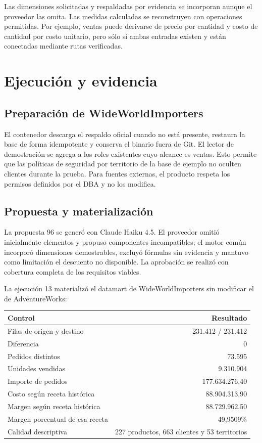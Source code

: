 \documentclass[11pt,letterpaper]{article}
\begin{document}
Las dimensiones solicitadas y respaldadas por evidencia se incorporan aunque el proveedor
las omita. Las medidas calculadas se reconstruyen con operaciones permitidas. Por ejemplo,
ventas puede derivarse de precio por cantidad y costo de cantidad por costo unitario, pero
sólo si ambas entradas existen y están conectadas mediante rutas verificadas.

\section{Ejecución y evidencia}

\subsection{Preparación de WideWorldImporters}

El contenedor descarga el respaldo oficial cuando no está presente, restaura la base de
forma idempotente y conserva el binario fuera de Git. El lector de demostración se agrega
a los roles existentes cuyo alcance es ventas. Esto permite que las políticas de seguridad
por territorio de la base de ejemplo no oculten clientes durante la prueba. Para fuentes
externas, el producto respeta los permisos definidos por el DBA y no los modifica.

\subsection{Propuesta y materialización}

La propuesta 96 se generó con Claude Haiku 4.5. El proveedor omitió inicialmente elementos
y propuso componentes incompatibles; el motor común incorporó dimensiones demostrables,
excluyó fórmulas sin evidencia y mantuvo como limitación el descuento no disponible. La
aprobación se realizó con cobertura completa de los requisitos viables.

La ejecución 13 materializó el datamart de WideWorldImporters sin modificar el de
AdventureWorks:

\begin{tabularx}{\textwidth}{@{}X r@{}}
  \toprule
  Control & Resultado \\
  \midrule
  Filas de origen y destino & 231.412 / 231.412 \\
  Diferencia & 0 \\
  Pedidos distintos & 73.595 \\
  Unidades vendidas & 9.310.904 \\
  Importe de pedidos & 177.634.276,40 \\
  Costo según receta histórica & 88.904.313,90 \\
  Margen según receta histórica & 88.729.962,50 \\
  Margen porcentual de esa receta & 49,9509\% \\
  Calidad descriptiva & 227 productos, 663 clientes y 53 territorios \\
  \bottomrule
\end{tabularx}
\end{document}
